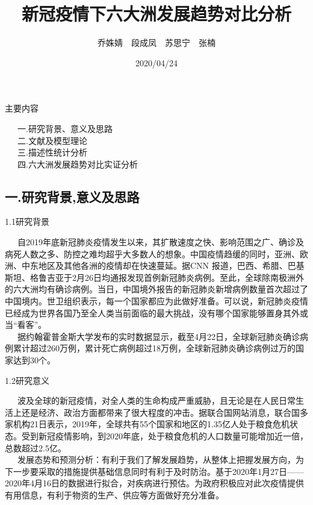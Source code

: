\documentclass[
  ignorenonframetext,
]{beamer}
\title{新冠疫情下六大洲发展趋势对比分析}
\author{乔姝婧 段成凤 苏思宁 张楠}
\date{2020/04/24}
\begin{document}
\frame{\titlepage}

\begin{frame}{主要内容}
\protect\hypertarget{section}{}

  一.研究背景、意义及思路\\
  二.文献及模型理论\\
  三.描述性统计分析\\
  四.六大洲发展趋势对比实证分析

\end{frame}

\hypertarget{section-1}{%
\subsection{一.研究背景,意义及思路}\label{section-1}}

\begin{frame}{1.1研究背景}
\protect\hypertarget{section-2}{}

  自2019年底新冠肺炎疫情发生以来，其扩散速度之快、影响范围之广、确诊及病死人数之多、防控之难均超乎大多数人的想象。中国疫情趋缓的同时，亚洲、欧洲、中东地区及其他各洲的疫情却在快速蔓延。据CNN
报道，巴西、希腊、巴基斯坦、格鲁吉亚于2月26日均通报发现首例新冠肺炎病例。至此，全球除南极洲外的六大洲均有确诊病例。当日，中国境外报告的新冠肺炎新增病例数量首次超过了中国境内。世卫组织表示，每一个国家都应为此做好准备。可以说，新冠肺炎疫情已经成为世界各国乃至全人类当前面临的最大挑战，没有哪个国家能够置身其外或当``看客''。\\
  据约翰霍普金斯大学发布的实时数据显示，截至4月22日，全球新冠肺炎确诊病例累计超过260万例，累计死亡病例超过18万例，全球新冠肺炎确诊病例过万的国家达到30个。

\end{frame}

\begin{frame}{1.2研究意义}
\protect\hypertarget{section-3}{}

  波及全球的新冠疫情，对全人类的生命构成严重威胁，且无论是在人民日常生活上还是经济、政治方面都带来了很大程度的冲击。据联合国网站消息，联合国多家机构21日表示，2019年，全球共有55个国家和地区的1.35亿人处于粮食危机状态。受到新冠疫情影响，到2020年底，处于粮食危机的人口数量可能增加近一倍，总数超过2.5亿。\\
  发展态势和预测分析：有利于我们了解发展趋势，从整体上把握发展方向，为下一步要采取的措施提供基础信息同时有利于及时防治。基于2020年1月27日------2020年4月16日的数据进行拟合，对疾病进行预估。为政府积极应对此次疫情提供有用信息，有利于物资的生产、供应等方面做好充分准备。

\end{frame}
\end{document}
